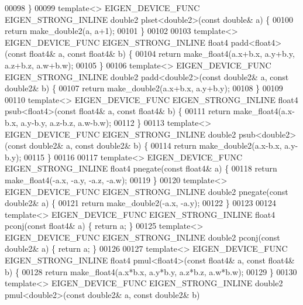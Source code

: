 \begin{DoxyCode}
00098 \}
00099 \textcolor{keyword}{template}<> EIGEN\_DEVICE\_FUNC EIGEN\_STRONG\_INLINE double2 plset<double2>(\textcolor{keyword}{const} \textcolor{keywordtype}{double}& a) \{
00100   \textcolor{keywordflow}{return} make\_double2(a, a+1);
00101 \}
00102 
00103 \textcolor{keyword}{template}<> EIGEN\_DEVICE\_FUNC EIGEN\_STRONG\_INLINE float4 padd<float4>(\textcolor{keyword}{const} float4& a, \textcolor{keyword}{const} float4& b) \{
00104   \textcolor{keywordflow}{return} make\_float4(a.x+b.x, a.y+b.y, a.z+b.z, a.w+b.w);
00105 \}
00106 \textcolor{keyword}{template}<> EIGEN\_DEVICE\_FUNC EIGEN\_STRONG\_INLINE double2 padd<double2>(\textcolor{keyword}{const} double2& a, \textcolor{keyword}{const} double2& b) 
      \{
00107   \textcolor{keywordflow}{return} make\_double2(a.x+b.x, a.y+b.y);
00108 \}
00109 
00110 \textcolor{keyword}{template}<> EIGEN\_DEVICE\_FUNC EIGEN\_STRONG\_INLINE float4 psub<float4>(\textcolor{keyword}{const} float4& a, \textcolor{keyword}{const} float4& b) \{
00111   \textcolor{keywordflow}{return} make\_float4(a.x-b.x, a.y-b.y, a.z-b.z, a.w-b.w);
00112 \}
00113 \textcolor{keyword}{template}<> EIGEN\_DEVICE\_FUNC EIGEN\_STRONG\_INLINE double2 psub<double2>(\textcolor{keyword}{const} double2& a, \textcolor{keyword}{const} double2& b) 
      \{
00114   \textcolor{keywordflow}{return} make\_double2(a.x-b.x, a.y-b.y);
00115 \}
00116 
00117 \textcolor{keyword}{template}<> EIGEN\_DEVICE\_FUNC EIGEN\_STRONG\_INLINE float4 pnegate(\textcolor{keyword}{const} float4& a) \{
00118   \textcolor{keywordflow}{return} make\_float4(-a.x, -a.y, -a.z, -a.w);
00119 \}
00120 \textcolor{keyword}{template}<> EIGEN\_DEVICE\_FUNC EIGEN\_STRONG\_INLINE double2 pnegate(\textcolor{keyword}{const} double2& a) \{
00121   \textcolor{keywordflow}{return} make\_double2(-a.x, -a.y);
00122 \}
00123 
00124 \textcolor{keyword}{template}<> EIGEN\_DEVICE\_FUNC EIGEN\_STRONG\_INLINE float4 pconj(\textcolor{keyword}{const} float4& a) \{ \textcolor{keywordflow}{return} a; \}
00125 \textcolor{keyword}{template}<> EIGEN\_DEVICE\_FUNC EIGEN\_STRONG\_INLINE double2 pconj(\textcolor{keyword}{const} double2& a) \{ \textcolor{keywordflow}{return} a; \}
00126 
00127 \textcolor{keyword}{template}<> EIGEN\_DEVICE\_FUNC EIGEN\_STRONG\_INLINE float4 pmul<float4>(\textcolor{keyword}{const} float4& a, \textcolor{keyword}{const} float4& b) \{
00128   \textcolor{keywordflow}{return} make\_float4(a.x*b.x, a.y*b.y, a.z*b.z, a.w*b.w);
00129 \}
00130 \textcolor{keyword}{template}<> EIGEN\_DEVICE\_FUNC EIGEN\_STRONG\_INLINE double2 pmul<double2>(\textcolor{keyword}{const} double2& a, \textcolor{keyword}{const} double2& b) 

\end{DoxyCode}
